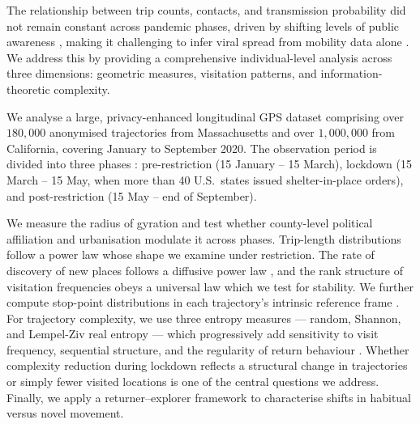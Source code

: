 \documentclass[main.tex]{subfiles}
\begin{document}
The relationship between trip counts, contacts, and transmission probability did not
remain constant across pandemic phases, driven by shifting levels of public awareness
\cite{nouvellet, rg_forecast_deaths}, making it challenging to infer viral spread
from mobility data alone \cite{Alessandretti}. We address this by providing a
comprehensive individual-level analysis across three dimensions: geometric measures,
visitation patterns, and information-theoretic complexity.

We analyse a large, privacy-enhanced longitudinal GPS dataset comprising over
$180{,}000$ anonymised trajectories from Massachusetts and over $1{,}000{,}000$ from
California, covering January to September 2020. The observation period is divided
into three phases \cite{lockdown}: pre-restriction (15 January -- 15 March),
lockdown (15 March -- 15 May, when more than 40 U.S.\ states issued shelter-in-place
orders), and post-restriction (15 May -- end of September).

We measure the radius of gyration \cite{radius_gyration} and test whether county-level
political affiliation and urbanisation modulate it across phases. Trip-length
distributions follow a power law \cite{radius_gyration, brockel} whose shape we
examine under restriction. The rate of discovery of new places follows a diffusive
power law \cite{scaling_visitation}, and the rank structure of visitation frequencies
obeys a universal law \cite{scaling_visitation, Schlapfer2021} which we test for
stability. We further compute stop-point distributions in each trajectory's intrinsic
reference frame \cite{radius_gyration}. For trajectory complexity, we use three
entropy measures --- random, Shannon, and Lempel-Ziv real entropy
\cite{entropic_measures, Lu2013} --- which progressively add sensitivity to visit
frequency, sequential structure, and the regularity of return behaviour
\cite{Teixeira2021, Cuttone2016}. Whether complexity reduction during lockdown
reflects a structural change in trajectories or simply fewer visited locations is one
of the central questions we address. Finally, we apply a returner--explorer framework
\cite{pappalardo_returners} to characterise shifts in habitual versus novel movement.
\end{document}
